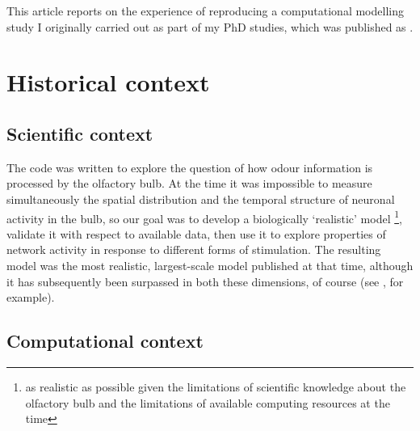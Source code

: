

This article reports on the experience of reproducing a computational modelling study I originally carried out as part of my PhD studies, which was published as \citet{Davison:2003}.

\section{Historical context}


\subsection{Scientific context}

The code was written to explore the question of how odour information is processed by the olfactory bulb.
At the time it was impossible to measure simultaneously the spatial distribution and the temporal structure of neuronal activity in the bulb,
so our goal was to develop a biologically `realistic' model
\footnote{as realistic as possible given the limitations of scientific knowledge about the olfactory bulb and the limitations of available computing resources at the time},
validate it with respect to available data, then use it to explore properties of network activity in response to different forms of stimulation.
The resulting model was the most realistic, largest-scale model published at that time, although it has subsequently been
surpassed in both these dimensions, of course (see \cite{Yu:2013}, for example).

\subsection{Computational context}

